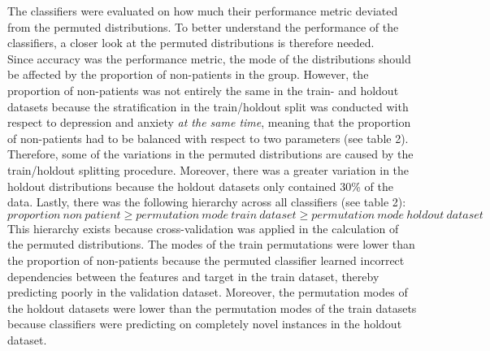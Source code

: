 \documentclass[11pt, a4paper]{article}
\begin{document}
The classifiers were evaluated on how much their performance metric deviated from the permuted distributions. To better understand the performance of the classifiers, a closer look at the permuted distributions is therefore needed. \\
Since accuracy was the performance metric, the mode of the distributions should be affected by the proportion of non-patients in the group. However, the proportion of non-patients was not entirely the same in the train- and holdout datasets because the stratification in the train/holdout split was conducted with respect to depression and anxiety \textit{at the same time}, meaning that the proportion of non-patients had to be balanced with respect to two parameters (see table 2). Therefore, some of the variations in the permuted distributions are caused by the train/holdout splitting procedure. Moreover, there was a greater variation in the holdout distributions because the holdout datasets only contained 30\% of the data. Lastly, there was the following hierarchy across all classifiers (see table 2): 
\[proportion \: non \: patient \geq permutation \: mode \: train \: dataset \geq permutation \: mode \: holdout \: dataset\]
This hierarchy exists because cross-validation was applied in the calculation of the permuted distributions. The modes of the train permutations were lower than the proportion of non-patients because the permuted classifier learned incorrect dependencies between the features and target in the train dataset, thereby predicting poorly in the validation dataset. Moreover, the permutation modes of the holdout datasets were lower than the permutation modes of the train datasets because classifiers were predicting on completely novel instances in the holdout dataset.\\
\end{document}
